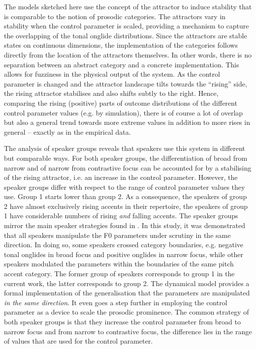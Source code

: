 The models sketched here use the concept of the attractor to induce stability that is comparable to the notion of prosodic categories. The attractors vary in stability when the control parameter is scaled, providing a mechanism to capture the overlapping of the tonal onglide distributions. Since the attractors are stable states on continuous dimensions, the implementation of the categories follows directly from the location of the attractors themselves. In other words, there is no separation between an abstract category and a concrete implementation. This allows for fuzziness in the physical output of the system. As the control parameter is changed and the attractor landscape tilts towards the ``rising” side, the rising attractor stabilises and also shifts subtly to the right. Hence, comparing the rising (positive) parts of outcome distributions of the different control parameter values (e.g. by simulation), there is of course a lot of overlap but also a general trend towards more extreme values in addition to more rises in general – exactly as in the empirical data. 

The analysis of speaker groups reveals that speakers use this system in different but comparable ways. For both speaker groups, the differentiation of broad from narrow and of narrow from contrastive focus can be accounted for by a stabilising of the rising attractor, i.e. an increase in the control parameter. However, the speaker groups differ with respect to the range of control parameter values they use. Group 1 starts lower than group 2. As a consequence, the speakers of group 2 have almost exclusively rising accents in their repertoire, the speakers of group 1 have considerable numbers of rising \emph{and} falling accents. The speaker groups mirror the main speaker strategies found in \citet{Griceetal2017}. In this study, it was demonstrated that all speakers manipulate the F0 parameters under scrutiny in the same direction. In doing so, some speakers crossed category boundaries, e.g. negative tonal onglides in broad focus and positive onglides in narrow focus, while other speakers modulated the parameters within the boundaries of the same pitch accent category. The former group of speakers corresponds to group 1 in the current work, the latter corresponds to group 2. The dynamical model provides a formal implementation of the generalisation that the parameters are manipulated \emph{in the same direction}. It even goes a step further in employing the control parameter as a device to scale the prosodic prominence. The common strategy of both speaker groups is that they increase the control parameter from broad to narrow focus and from narrow to contrastive focus, the difference lies in the range of values that are used for the control parameter.

